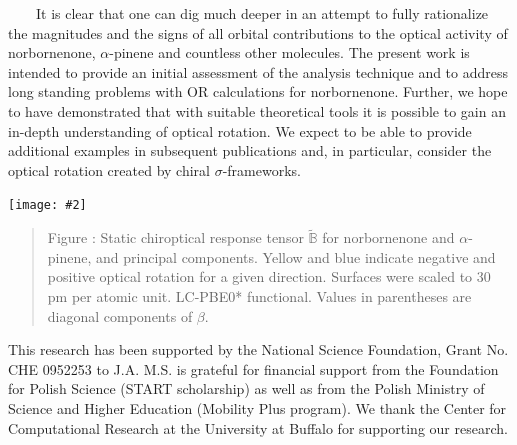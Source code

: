 \documentclass[landscape,a0b,final]{a0poster}
\newcommand{\mat}[1]{\mathbb{#1}} %
\newcommand{\tensortwo}[1]{\mat{#1}}
\newcommand{\bindent}{\ \ \ \ }
\newenvironment{poster}{
  \begin{center}
  \begin{minipage}[c]{0.98\textwidth}
}{
  \end{minipage} 
  \end{center}
}
\newcommand{\pbox}[4]{
\psshadowbox[#3]{
\begin{minipage}[t][#2][t]{#1}
#4
\end{minipage}
}}
\newcommand{\myfig}[3][0]{
\begin{center}
  \vspace{0.25cm}
  \texttt{[image: \#2]}
  \nobreak\medskip
\end{center}}
\newcommand{\mycaption}[1]{
  \vspace{0.25cm}
  \begin{quote}
    {{\sc Figure} \arabic{figure}: #1}
  \end{quote}
  \vspace{0.25cm}
  \stepcounter{figure}
}
\begin{document}
\begin{poster}
\begin{multicols}{3}
    \bindent It is clear that one can dig much deeper in an attempt to fully
    rationalize the magnitudes and the signs of all orbital contributions
    to the optical activity of norbornenone, $\alpha$-pinene and countless
    other molecules. The present work is intended to provide an initial
    assessment of the analysis technique and to address long standing
    problems with OR calculations for norbornenone. Further, we
    hope to have demonstrated that with suitable theoretical tools it is
    possible to gain an in-depth understanding of optical rotation. We
    expect to be able to provide additional examples in subsequent
    publications and, in particular, consider the optical rotation created
    by chiral $\sigma$-frameworks.
    \begin{center}
    \myfig[0]{figures/norbornenone-pinene-comparison}{1.0}
    \mycaption{Static chiroptical response tensor $\tilde{\tensortwo{B}}$
        for norbornenone and $\alpha$-pinene, and principal
        components. Yellow and blue indicate negative and positive optical
        rotation for a given direction.  Surfaces were scaled to 30 pm per
        atomic unit. LC-PBE0* functional. Values in parentheses are
        diagonal components of $\tensortwo{\beta}$.}
    \end{center}

\vspace{0.25cm}
\begin{center}
\pbox{0.8\columnwidth}{}{linewidth=2mm,framearc=0.1,linecolor=ubblue,fillstyle=gradient,gradangle=0,gradbegin=white,gradend=ubgray,gradmidpoint=1.0,framesep=1em}
{\begin{center} \Large \color{ubblue}{\bf{Acknowledgements}}\end{center}}
\end{center}
\vspace{0.25cm}
    
     This research has been supported by the National Science
     Foundation, Grant No. CHE 0952253 to J.A. M.S. is grateful
     for financial support from the Foundation for Polish Science
     (START scholarship) as well as from the Polish Ministry of
     Science and Higher Education (Mobility Plus program). We
     thank the Center for Computational Research at the University
     at Buffalo for supporting our research.
      



\end{multicols}
\end{poster}
\end{document}
